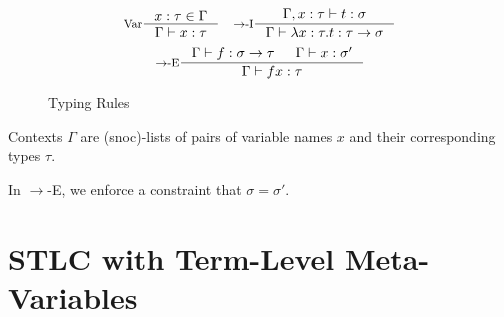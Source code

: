\documentclass[a4paper]{report}
\newcommand{\Intro}[1]{#1-\textrm{I}}
\newcommand{\Elim}[1]{#1-\textrm{E}}
\begin{document}
\begin{figure*}[h]
  \[
    \inference[Var]{x : \tau \in \Gamma}
                   {\Gamma \vdash x : \tau}
    \quad
    \inference[\Intro{$\to$}]{\Gamma, x : \tau \vdash t : \sigma}
                             {\Gamma \vdash \lambda x : \tau. t : \tau \to \sigma}
  \]
  \[
    \inference[\Elim{$\to$}]{\Gamma \vdash f : \sigma \to \tau & \Gamma \vdash x : \sigma'}
                            {\Gamma \vdash f x : \tau}
  \]
  
  \caption*{Typing Rules}
  \label{fig:base-stlc-oltr}
\end{figure*}

Contexts $\Gamma$ are (snoc)-lists of pairs of variable names $x$ and their corresponding types $\tau$.

In \Elim{$\to$}, we enforce a constraint that $\sigma = \sigma'$.


\newpage
\section{STLC with Term-Level Meta-Variables}
\end{document}
